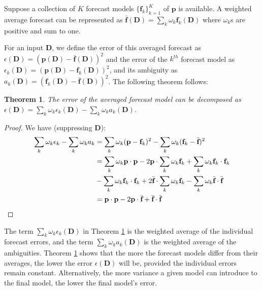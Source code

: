 \documentclass{article}
\newtheorem{theorem}{Theorem}
\begin{document}
Suppose a collection of $K$ forecast models $\{\textbf{f}_k\}_{k=1}^{K}$ of $\textbf{p}$ is available. A weighted average forecast can be represented as $\bar{\textbf{f}}(\textbf{D}) = \sum_k \omega_k \textbf{f}_k(\textbf{D})$ where $\omega_k$s are positive and sum to one. 

For an input $\textbf{D}$, we define the error of this averaged forecast as $\epsilon(\textbf{D})=(\textbf{p}(\textbf{D}) - \bar{\textbf{f}}(\textbf{D}))^2$ and the error of the $k^{th}$ forecast model as $\epsilon_k(\textbf{D}) = (\textbf{p}(\textbf{D}) - \textbf{f}_k(\textbf{D}))^2$, and its ambiguity as $a_k(\textbf{D}) = (\textbf{f}_k(\textbf{D}) - \bar{\textbf{f}}(\textbf{D}))^2$. The following theorem follows: 

\begin{theorem} \label{thm1}
The error of the averaged forecast model can be decomposed as $\epsilon(\textbf{D}) = \sum_k \omega_k \epsilon_k(\textbf{D}) - \sum_k \omega_k a_k(\textbf{D})$. 
\end{theorem}

\begin{proof}
We have (suppressing $\textbf{D}$): 
\begin{align} \label{eq1}
    \sum_k \omega_k \epsilon_k - \sum_k \omega_k a_k &= \sum_k \omega_k (\textbf{p} - \textbf{f}_k)^2 - \sum_k \omega_k (\textbf{f}_k - \bar{\textbf{f}})^2 \notag \\
    & \hspace{-0pt} = \sum_k \omega_k \textbf{p} \cdot \textbf{p} - 2\textbf{p} \cdot \sum_k \omega_k \textbf{f}_k + \sum_k \omega_k \textbf{f}_k \cdot \textbf{f}_k \notag \\
    & \hspace{-0pt} - \sum_k \omega_k \textbf{f}_k \cdot \textbf{f}_k + 2\bar{\textbf{f}} \cdot \sum_k \omega_k \textbf{f}_k - \sum_k \omega_k \bar{\textbf{f}} \cdot \bar{\textbf{f}} \notag \\
    &= \textbf{p} \cdot \textbf{p} - 2\textbf{p} \cdot \bar{\textbf{f}} + \bar{\textbf{f}} \cdot \bar{\textbf{f}}
\end{align}
\end{proof}
The term $\sum_k \omega_k \epsilon_k(\textbf{D})$ in Theorem \ref{thm1} is the weighted average of the individual forecast errors, and the term $\sum_k \omega_k a_k(\textbf{D})$ is the weighted average of the ambiguities. Theorem \ref{thm1} shows that the more the forecast models differ from their averages, the lower the error $\epsilon(\textbf{D})$ will be, provided the individual errors remain constant. Alternatively, the more variance a given model can introduce to the final model, the lower the final model's error. 
\end{document}
